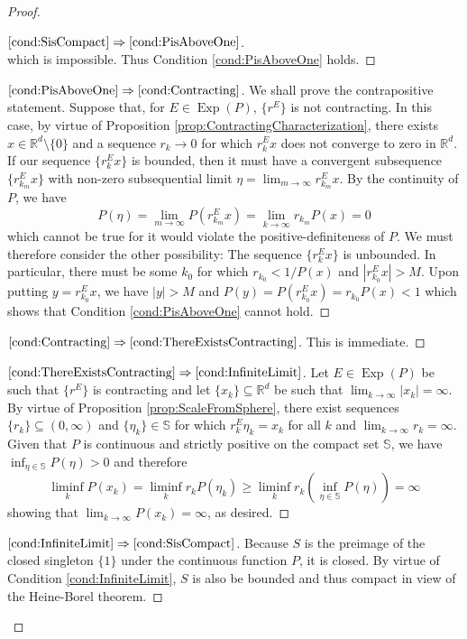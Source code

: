 \documentclass[11pt]{article}
\theoremstyle{remark}
\newcommand*{\myproofname}{Proof}
\newenvironment{subproof}[1][\myproofname]{\begin{proof}[#1]\renewcommand*{\qedsymbol}{$\mathbin{/\mkern-6mu/}$}}{\end{proof}}
\newcommand\Exp{\operatorname{Exp}}
\begin{document}
\begin{proof}
\begin{subproof}[$\ref{cond:SisCompact}\Rightarrow\ref{cond:PisAboveOne}$]
\begin{equation*}
\end{equation*}
which is impossible. Thus Condition \ref{cond:PisAboveOne} holds.
\end{subproof}
\begin{subproof}[$\ref{cond:PisAboveOne}\Rightarrow\ref{cond:Contracting}$]
We shall prove the contrapositive statement. Suppose that, for $E\in\Exp(P)$, $\{r^E\}$ is not contracting. In this case, by virtue of Proposition \ref{prop:ContractingCharacterization}, there exists $x\in\mathbb{R}^d\setminus\{0\}$ and a sequence $r_k\to 0$ for which $r_k^Ex$ does not converge to zero in $\mathbb{R}^d$. If our sequence $\{r_k^Ex\}$ is bounded, then it must have a convergent subsequence $\{r_{k_m}^Ex\}$ with non-zero subsequential limit $\eta=\lim_{m\to\infty}r_{k_m}^Ex$. By the continuity of $P$, we have
\begin{equation*}
P(\eta)=\lim_{m\to\infty}P(r_{k_m}^Ex)=\lim_{k\to\infty}r_{k_m}P(x)=0
\end{equation*}
which cannot be true for it would violate the positive-definiteness of $P$. We must therefore consider the other possibility: The sequence $\{r_k^Ex\}$ is unbounded. In particular, there must be some $k_0$ for which $r_{k_0}<1/P(x)$ and $|r_{k_0}^Ex|>M$. Upon putting $y=r_{k_0}^Ex$, we have $|y|>M$ and  $P(y)=P(r_{k_0}^Ex)=r_{k_0}P(x)<1$ which shows that Condition \ref{cond:PisAboveOne} cannot hold.
\end{subproof}
\begin{subproof}[$\ref{cond:Contracting}\Rightarrow\ref{cond:ThereExistsContracting}$] This is immediate.
\end{subproof}
\begin{subproof}[$\ref{cond:ThereExistsContracting}\Rightarrow\ref{cond:InfiniteLimit}$]
Let $E\in\Exp(P)$ be such that $\{r^E\}$ is contracting and let $\{x_k\}\subseteq\mathbb{R}^d$ be such that $\lim_{k\to\infty}|x_k|=\infty$. By virtue of Proposition \ref{prop:ScaleFromSphere}, there exist sequences $\{r_k\}\subseteq (0,\infty)$ and $\{\eta_k\}\in\mathbb{S}$ for which $r_k^E\eta_k=x_k$ for all $k$ and $\lim_{k\to\infty}r_k=\infty$. Given that $P$ is continuous and strictly positive on the compact set $\mathbb{S}$, we have $\inf_{\eta\in\mathbb{S}}P(\eta)>0$ and therefore
\begin{equation*}
\liminf_k P(x_k)=\liminf_k r_kP(\eta_k)\geq \liminf_k r_k\left(\inf_{\eta\in\mathbb{S}}P(\eta)\right)=\infty
\end{equation*}
showing that $\lim_{k\to\infty} P(x_k)=\infty$, as desired.
\end{subproof}
\begin{subproof}[$\ref{cond:InfiniteLimit}\Rightarrow\ref{cond:SisCompact}$]
Because $S$ is the preimage of the closed singleton $\{1\}$ under the continuous function $P$, it is closed. By virtue of Condition \ref{cond:InfiniteLimit}, $S$ is also be bounded and thus compact in view of the Heine-Borel theorem.
\end{subproof}
\end{proof}
\end{document}
